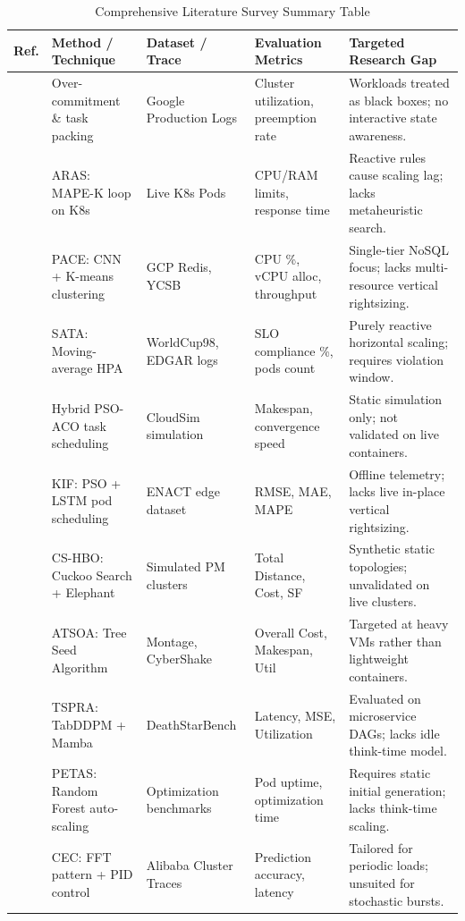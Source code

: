 \documentclass[12pt,a4paper]{report}
\begin{document}
\begin{table}[htbp]
\centering
\scriptsize
\caption{Comprehensive Literature Survey Summary Table}
\label{tab:litsum}
\begin{tabularx}{\linewidth}{@{}p{0.8cm}p{2.8cm}p{2.3cm}p{3.2cm}X@{}}
\toprule
\textbf{Ref.} & \textbf{Method / Technique} & \textbf{Dataset / Trace} & \textbf{Evaluation Metrics} & \textbf{Targeted Research Gap} \\ \midrule
\cite{borg} & Over-commitment \& task packing & Google Production Logs & Cluster utilization, preemption rate & Workloads treated as black boxes; no interactive state awareness. \\
\cite{aras} & ARAS: MAPE-K loop on K8s & Live K8s Pods & CPU/RAM limits, response time & Reactive rules cause scaling lag; lacks metaheuristic search. \\
\cite{pace} & PACE: CNN + K-means clustering & GCP Redis, YCSB & CPU \%, vCPU alloc, throughput & Single-tier NoSQL focus; lacks multi-resource vertical rightsizing. \\
\cite{sata} & SATA: Moving-average HPA & WorldCup98, EDGAR logs & SLO compliance \%, pods count & Purely reactive horizontal scaling; requires violation window. \\
\cite{psoaco} & Hybrid PSO-ACO task scheduling & CloudSim simulation & Makespan, convergence speed & Static simulation only; not validated on live containers. \\
\cite{pso_lstm} & KIF: PSO + LSTM pod scheduling & ENACT edge dataset & RMSE, MAE, MAPE & Offline telemetry; lacks live in-place vertical rightsizing. \\
\cite{cshbo} & CS-HBO: Cuckoo Search + Elephant & Simulated PM clusters & Total Distance, Cost, SF & Synthetic static topologies; unvalidated on live clusters. \\
\cite{atsoa} & ATSOA: Tree Seed Algorithm & Montage, CyberShake & Overall Cost, Makespan, Util & Targeted at heavy VMs rather than lightweight containers. \\
\cite{tspra} & TSPRA: TabDDPM + Mamba & DeathStarBench & Latency, MSE, Utilization & Evaluated on microservice DAGs; lacks idle think-time model. \\
\cite{petas} & PETAS: Random Forest auto-scaling & Optimization benchmarks & Pod uptime, optimization time & Requires static initial generation; lacks think-time scaling. \\
\cite{cec} & CEC: FFT pattern + PID control & Alibaba Cluster Traces & Prediction accuracy, latency & Tailored for periodic loads; unsuited for stochastic bursts. \\

\end{tabularx}
\end{table}
\end{document}
